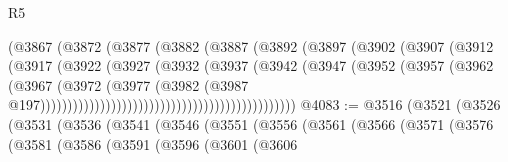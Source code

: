 \begin{lexlean}{R5}
\begin{coremodule}
                                                (@3867
                                                  (@3872
                                                    (@3877
                                                      (@3882
                                                        (@3887
                                                          (@3892
                                                            (@3897
                                                              (@3902
                                                                (@3907
                                                                  (@3912
                                                                    (@3917
                                                                      (@3922
                                                                        (@3927
                                                                          (@3932
                                                                            (@3937
                                                                              (@3942
                                                                                (@3947
                                                                                  (@3952
                                                                                    (@3957
                                                                                      (@3962
                                                                                        (@3967
                                                                                          (@3972
                                                                                            (@3977
                                                                                              (@3982
                                                                                                (@3987
                                                                                                  @197)))))))))))))))))))))))))))))))))))))))))))))))
@4083 := @3516
    (@3521
      (@3526
        (@3531
          (@3536
            (@3541
              (@3546
                (@3551
                  (@3556
                    (@3561
                      (@3566
                        (@3571
                          (@3576
                            (@3581
                              (@3586
                                (@3591
                                  (@3596
                                    (@3601
                                      (@3606

\end{coremodule}
\end{lexlean}
